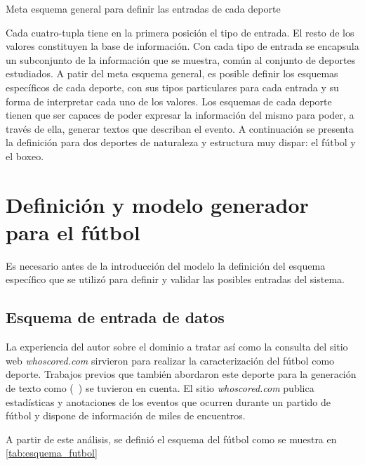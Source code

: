 \begin{table}[]
\begin{center}
    \end{center}
    \caption{Meta esquema general para definir las entradas de cada deporte}
    \label{tab:esquema_general}
\end{table}

    Cada cuatro-tupla tiene en la primera posición el tipo de entrada. El resto de los valores constituyen la base de información. Con cada tipo de entrada 
se encapsula un subconjunto de la información que se muestra, común al conjunto de deportes estudiados. 
    A patir del meta esquema general, es posible definir los esquemas específicos de cada deporte, con sus tipos particulares para cada entrada y su forma de interpretar 
cada uno de los valores. Los esquemas de cada deporte tienen que ser capaces de poder expresar la información del mismo para poder, a través de ella, 
generar textos que describan el evento. A continuación se presenta la definición para dos deportes de naturaleza y estructura muy dispar: el fútbol y 
el boxeo.


\section{Definición y modelo generador para el fútbol}

    Es necesario antes de la introducción del modelo la definición del esquema específico que se utilizó para 
definir y validar las posibles entradas del sistema.

\subsection{Esquema de entrada de datos}

    La experiencia del autor sobre el dominio a tratar así como la consulta del sitio web \textit{whoscored.com} sirvieron para realizar la caracterización del 
fútbol como deporte. Trabajos previos que también abordaron este deporte para la generación de texto como (~\cite{theune2001data,aires2016automatic,van2017pass}) se tuvieron en cuenta. 
El sitio \textit{whoscored.com} publica estadísticas y anotaciones de los eventos que ocurren durante un partido de fútbol y dispone de información de miles de encuentros.

A partir de este análisis, se definió el esquema del fútbol como se muestra en \ref{tab:esquema_futbol}

